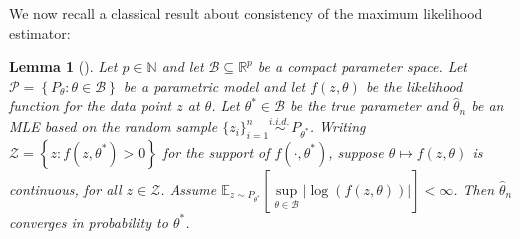 \documentclass{article}
\newtheorem{lemma}{Lemma}
\newcommand{\iid}{i.i.d.{\ }}
\begin{document}
We now recall a classical result about consistency of the maximum likelihood estimator:

\begin{lemma}[\cite{Lehmann_Point_Estim}]
\label{lemma:Consis_MLE}
Let $p \in \mathbb{N}$ and let $\mathcal{B} \subseteq \mathbb{R}^p$ be a compact parameter space. Let $\mathcal{P} = \left\{P_\theta: \theta\in \mathcal{B} \right\}$ be a parametric model and let $f(z, \theta)$ be the likelihood function for the data point $z$ at $\theta$. Let $\theta^* \in \mathcal{B}$ be the true parameter and $\widehat{\theta}_n$ be an MLE based on the random sample $\{z_i\}_{i = 1}^n \overset{\iid}{\sim} P_{\theta^*}$. Writing $\mathcal{Z} = \left\{z:  f(z, \theta^*) > 0\right\}$ for the support of $f(\cdot, \theta^*)$, suppose $\theta \mapsto f(z, \theta)$ is continuous, for all $z \in \mathcal{Z}$. Assume $\mathbb{E}_{z \sim P_{\theta^*}}\left[\mathop{\sup}\limits_{\theta \in \mathcal{B}}|\log(f(z, \theta))|\right] < \infty$. Then $\widehat{\theta}_n$ converges in probability to $\theta^*$.
\end{lemma}
\end{document}
